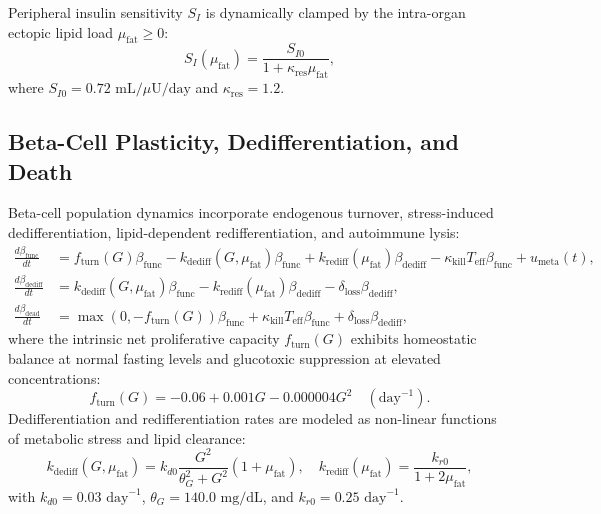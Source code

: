 \documentclass[11pt,a4paper]{article}
\begin{document}
Peripheral insulin sensitivity $S_I$ is dynamically clamped by the intra-organ ectopic lipid load $\mu_{\mathrm{fat}} \ge 0$:
\begin{equation}
S_I(\mu_{\mathrm{fat}}) = \frac{S_{I0}}{1 + \kappa_{\mathrm{res}} \mu_{\mathrm{fat}}},
\end{equation}
where $S_{I0} = 0.72\text{ mL/}\mu\text{U/day}$ and $\kappa_{\mathrm{res}} = 1.2$.

\subsection{Beta-Cell Plasticity, Dedifferentiation, and Death}

Beta-cell population dynamics incorporate endogenous turnover, stress-induced dedifferentiation, lipid-dependent redifferentiation, and autoimmune lysis:
\begin{align}
\frac{d\beta_{\mathrm{func}}}{dt} &= f_{\mathrm{turn}}(G) \beta_{\mathrm{func}} - k_{\mathrm{dediff}}(G, \mu_{\mathrm{fat}}) \beta_{\mathrm{func}} + k_{\mathrm{rediff}}(\mu_{\mathrm{fat}}) \beta_{\mathrm{dediff}} - \kappa_{\mathrm{kill}} T_{\mathrm{eff}} \beta_{\mathrm{func}} + u_{\mathrm{meta}}(t), \label{eq:dbeta_f} \\
\frac{d\beta_{\mathrm{dediff}}}{dt} &= k_{\mathrm{dediff}}(G, \mu_{\mathrm{fat}}) \beta_{\mathrm{func}} - k_{\mathrm{rediff}}(\mu_{\mathrm{fat}}) \beta_{\mathrm{dediff}} - \delta_{\mathrm{loss}} \beta_{\mathrm{dediff}}, \label{eq:dbeta_d} \\
\frac{d\beta_{\mathrm{dead}}}{dt} &= \max\left(0, -f_{\mathrm{turn}}(G)\right) \beta_{\mathrm{func}} + \kappa_{\mathrm{kill}} T_{\mathrm{eff}} \beta_{\mathrm{func}} + \delta_{\mathrm{loss}} \beta_{\mathrm{dediff}}, \label{eq:dbeta_dead}
\end{align}
where the intrinsic net proliferative capacity $f_{\mathrm{turn}}(G)$ exhibits homeostatic balance at normal fasting levels and glucotoxic suppression at elevated concentrations:
\begin{equation}
f_{\mathrm{turn}}(G) = -0.06 + 0.001 G - 0.000004 G^2 \quad (\text{day}^{-1}).
\end{equation}
Dedifferentiation and redifferentiation rates are modeled as non-linear functions of metabolic stress and lipid clearance:
\begin{equation}
k_{\mathrm{dediff}}(G, \mu_{\mathrm{fat}}) = k_{d0} \frac{G^2}{\theta_G^2 + G^2} (1 + \mu_{\mathrm{fat}}), \quad k_{\mathrm{rediff}}(\mu_{\mathrm{fat}}) = \frac{k_{r0}}{1 + 2\mu_{\mathrm{fat}}},
\end{equation}
with $k_{d0} = 0.03\text{ day}^{-1}$, $\theta_G = 140.0\text{ mg/dL}$, and $k_{r0} = 0.25\text{ day}^{-1}$.
\end{document}
